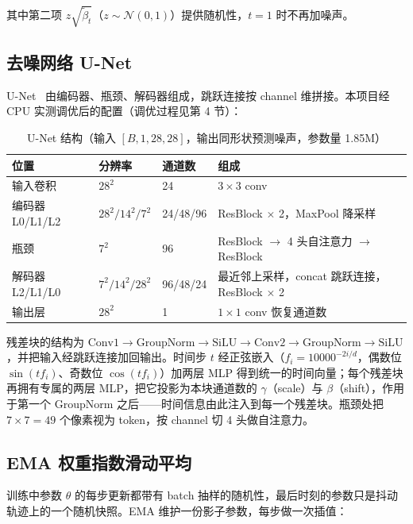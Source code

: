 \documentclass[11pt]{article}
\begin{document}
其中第二项 $z\sqrt{\tilde{\beta}_t}$（$z\sim\mathcal{N}(0,1)$）提供随机性，$t=1$ 时不再加噪声。

\subsection{去噪网络 U-Net}

U-Net~\parencite{ronneberger2015unet} 由编码器、瓶颈、解码器组成，跳跃连接按 channel 维拼接。本项目经 CPU 实测调优后的配置（调优过程见第 4 节）：

\begin{table}[h]
    \centering
    \caption{U-Net 结构（输入 $[B,1,28,28]$，输出同形状预测噪声，参数量 1.85M）}
    \label{tab:unet}
    \begin{tabular}{l l l l}
        \toprule
        \textbf{位置} & \textbf{分辨率} & \textbf{通道数} & \textbf{组成} \\
        \midrule
        输入卷积 & $28^2$ & 24 & $3\times3$ conv \\
        编码器 L0/L1/L2 & $28^2/14^2/7^2$ & 24/48/96 & ResBlock $\times$ 2，MaxPool 降采样 \\
        瓶颈 & $7^2$ & 96 & ResBlock $\rightarrow$ 4 头自注意力 $\rightarrow$ ResBlock \\
        解码器 L2/L1/L0 & $7^2/14^2/28^2$ & 96/48/24 & 最近邻上采样，concat 跳跃连接，ResBlock $\times$ 2 \\
        输出层 & $28^2$ & 1 & $1\times1$ conv 恢复通道数 \\
        \bottomrule
    \end{tabular}
\end{table}

残差块的结构为 $\mathrm{Conv1} \rightarrow \mathrm{GroupNorm} \rightarrow \mathrm{SiLU} \rightarrow \mathrm{Conv2} \rightarrow \mathrm{GroupNorm} \rightarrow \mathrm{SiLU}$，并把输入经跳跃连接加回输出。时间步 $t$ 经正弦嵌入（$f_i = 10000^{-2i/d}$，偶数位 $\sin(t f_i)$、奇数位 $\cos(t f_i)$）加两层 MLP 得到统一的时间向量；每个残差块再拥有专属的两层 MLP，把它投影为本块通道数的 $\gamma$（scale）与 $\beta$（shift），作用于第一个 GroupNorm 之后——时间信息由此注入到每一个残差块。瓶颈处把 $7\times7=49$ 个像素视为 token，按 channel 切 4 头做自注意力。

\subsection{EMA 权重指数滑动平均}

训练中参数 $\theta$ 的每步更新都带有 batch 抽样的随机性，最后时刻的参数只是抖动轨迹上的一个随机快照。EMA 维护一份影子参数，每步做一次插值：
\end{document}
